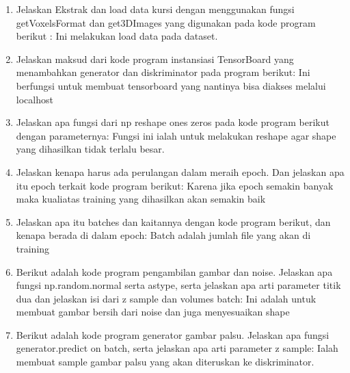\begin{enumerate}
        	\item Jelaskan Ekstrak dan load data kursi dengan menggunakan fungsi getVoxelsFormat dan get3DImages yang digunakan pada kode program berikut :
Ini melakukan load data pada dataset.

		

        	\item Jelaskan maksud dari kode program instansiasi TensorBoard yang menambahkan generator dan diskriminator pada program berikut: 
Ini berfungsi untuk membuat tensorboard yang nantinya bisa diakses melalui localhost

		

        	\item Jelaskan apa fungsi dari np reshape ones zeros pada kode program berikut dengan parameternya:
Fungsi ini ialah untuk melakukan reshape agar shape yang dihasilkan tidak terlalu besar.

		

       	\item Jelaskan kenapa harus ada perulangan dalam meraih epoch. Dan jelaskan apa itu epoch terkait kode program berikut:
Karena jika epoch semakin banyak maka kualiatas training yang dihasilkan akan semakin baik

		

        	\item Jelaskan apa itu batches dan kaitannya dengan kode program berikut, dan kenapa berada di dalam epoch:
Batch adalah jumlah file yang akan di training

		

        	\item Berikut adalah kode program pengambilan gambar dan noise. Jelaskan apa fungsi np.random.normal serta astype, serta jelaskan apa arti parameter titik dua dan jelaskan isi dari z sample dan volumes batch:
Ini adalah untuk membuat gambar bersih dari noise dan juga menyesuaikan shape

		

        	\item Berikut adalah kode program generator gambar palsu. Jelaskan apa fungsi generator.predict on batch, serta jelaskan apa arti parameter z sample:
Ialah membuat sample gambar palsu yang akan diteruskan ke diskriminator.


\end{enumerate}
